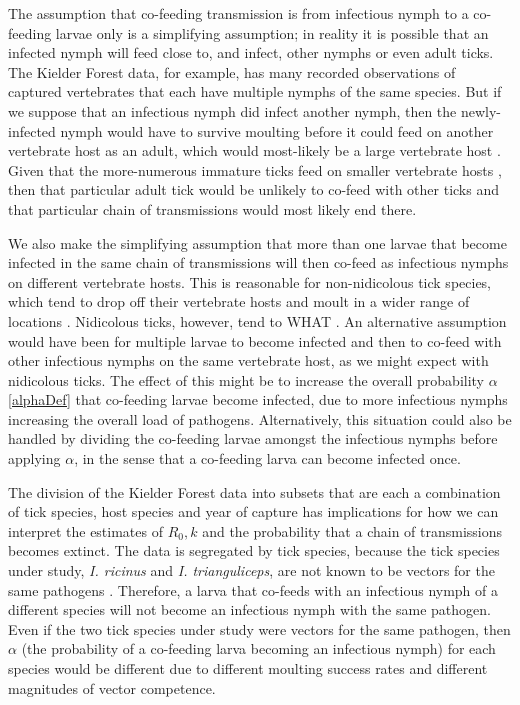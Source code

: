 \documentclass{article}
\begin{document}
The assumption that co-feeding transmission is from infectious nymph to a co-feeding larvae only is a simplifying assumption; in reality it is possible that an infected nymph will feed close to, and infect, other nymphs or even adult ticks. The Kielder Forest data, for example, has many recorded observations of captured vertebrates that each have multiple nymphs of the same species. But if we suppose that an infectious nymph did infect another nymph, then the newly-infected nymph would have to survive moulting before it could feed on another vertebrate host as an adult, which would most-likely be a large vertebrate host \cite{}. Given that the more-numerous immature ticks feed on smaller vertebrate hosts \cite{}, then that particular adult tick would be unlikely to co-feed with other ticks and that particular chain of transmissions would most likely end there.

We also make the simplifying assumption that more than one larvae that become infected in the same chain of transmissions will then co-feed as infectious nymphs on different vertebrate hosts. This is reasonable for non-nidicolous tick species, which tend to drop off their vertebrate hosts and moult in a wider range of locations \cite{}. Nidicolous ticks, however, tend to WHAT \cite{}. An alternative assumption would have been for multiple larvae to become infected and then to co-feed with other infectious nymphs on the same vertebrate host, as we might expect with nidicolous ticks. The effect of this might be to increase the overall probability $ \alpha $ \eqref{alphaDef} that co-feeding larvae become infected, due to more infectious nymphs increasing the overall load of pathogens. Alternatively, this situation could also be handled by dividing the co-feeding larvae amongst the infectious nymphs before applying $ \alpha $, in the sense that a co-feeding larva can become infected once.

The division of the Kielder Forest data into subsets that are each a combination of tick species, host species and year of capture has implications for how we can interpret the estimates of $ R_0, k $ and the probability that a chain of transmissions becomes extinct. The data is segregated by tick species, because the tick species under study, \textit{I. ricinus} and \textit{I. trianguliceps}, are not known to be vectors for the same pathogens \cite{}. Therefore, a larva that co-feeds with an infectious nymph of a different species will not become an infectious nymph with the same pathogen. Even if the two tick species under study were vectors for the same pathogen, then $ \alpha $ (the probability of a co-feeding larva becoming an infectious nymph) for each species would be different due to different moulting success rates and different magnitudes of vector competence.
\end{document}
